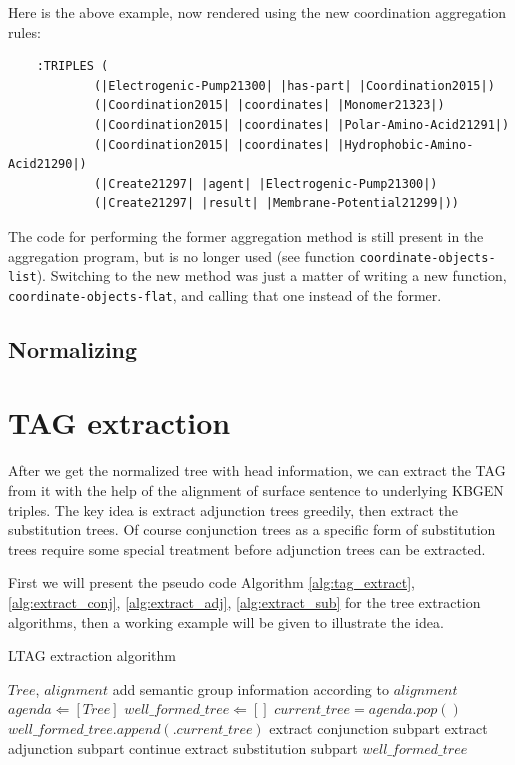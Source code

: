 \documentclass[a4paper]{article}
\begin{document}
Here is the above example, now rendered using the new coordination
aggregation rules:

\begin{verbatim}
    :TRIPLES (
            (|Electrogenic-Pump21300| |has-part| |Coordination2015|)
            (|Coordination2015| |coordinates| |Monomer21323|)
            (|Coordination2015| |coordinates| |Polar-Amino-Acid21291|)
            (|Coordination2015| |coordinates| |Hydrophobic-Amino-Acid21290|)
            (|Create21297| |agent| |Electrogenic-Pump21300|)
            (|Create21297| |result| |Membrane-Potential21299|))
\end{verbatim}

The code for performing the former aggregation method is still present
in the aggregation program, but is no longer used (see function
\texttt{coordinate-objects-list}). Switching to the new method was
just a matter of writing a new function,
\texttt{coordinate-objects-flat}, and calling that one instead of the
former.

\subsection{Normalizing}

\section{TAG extraction}
After we get the normalized tree with head information, we can extract the TAG from it with the help of the alignment of surface sentence to underlying KBGEN triples.
The key idea is extract adjunction trees greedily, then extract the substitution trees. Of course conjunction trees as a specific form of substitution trees require
some special treatment before adjunction trees can be extracted.

First we will present the pseudo code Algorithm \ref{alg:tag_extract}, \ref{alg:extract_conj}, \ref{alg:extract_adj}, \ref{alg:extract_sub} for the tree extraction algorithms, then a working example will be given to illustrate the idea.
\begin{algorithm}
    \caption{LTAG extraction algorithm}
    \label{alg:tag_extract}
    \begin{algorithmic}[1]
        \REQUIRE $Tree$, $alignment$ 
        \STATE add semantic group information according to $alignment$
        \ENDFOR
        \STATE $agenda \Leftarrow [Tree]$
        \STATE $well\_formed\_tree \Leftarrow []$
            \STATE $current\_tree = agenda.pop() $
            \STATE $well\_formed\_tree.append(.current\_tree)$
            \ENDIF
            \STATE extract conjunction subpart
            \STATE extract adjunction subpart
                \STATE continue
            \ELSE
                \STATE extract substitution subpart
            \ENDIF
        \ENDWHILE
        \RETURN $well\_formed\_tree$
    \end{algorithmic}
\end{algorithm}
\end{document}
